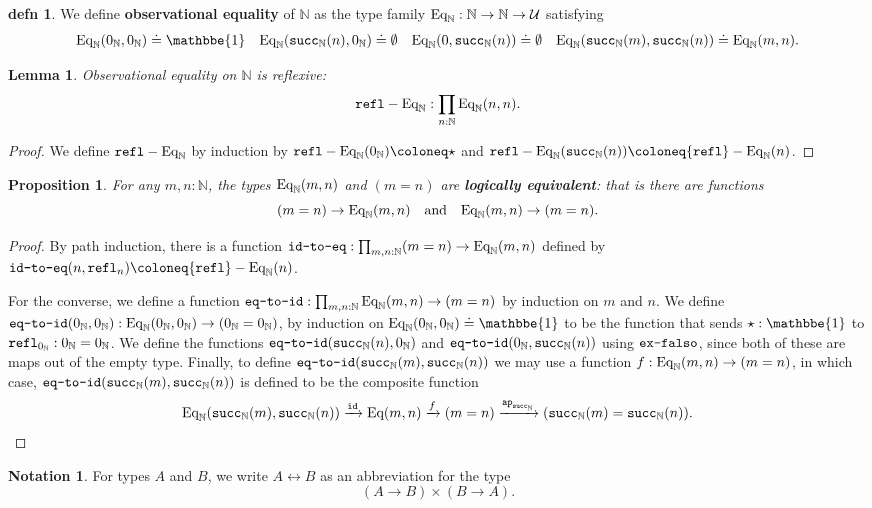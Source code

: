 \documentclass{amsart}
\theoremstyle{theorem}
\newtheorem*{lem}{Lemma}
\newtheorem*{prop}{Proposition}
\theoremstyle{definition}
\newtheorem*{defn}{defn}
\newtheorem*{ntn}{Notation}
\theoremstyle{remark}
\newcommand{\0}{\mathbbe{0}}
\newcommand{\1}{\mathbbe{1}}
\newcommand{\2}{\mathbbe{2}}
\newcommand{\3}{\mathbbe{3}}
\newcommand{\4}{\mathbbe{4}}
\newcommand{\term}[1]{{\textup{\texttt{#1}}}}
\newcommand{\id}{\term{id}}
\newcommand{\bN}{{\mathbb{N}}}
\newcommand{\suc}{\term{succ}_{\bN}}
\newcommand{\refl}{\term{refl}}
\newcommand{\ap}{\term{ap}}
\newcommand{\UU}{\mathcal{U}}
\newcommand{\Eq}{\textup{\text{Eq}}}
\begin{document}
\begin{defn} We define \textbf{observational equality} of $\bN$ as the type family $\Eq_\bN : \bN \to \bN \to \UU$ satisfying
\[ \Eq_\bN(0_\bN,0_\bN) \doteq \1 \quad \Eq_\bN(\suc(n),0_\bN) \doteq \emptyset \quad \Eq_\bN(0,\suc(n)) \doteq \emptyset \quad \Eq_\bN(\suc(m), \suc(n)) \doteq \Eq_\bN(m,n).\]
\end{defn}

\begin{lem} Observational equality on $\bN$ is reflexive:
\[ \refl-\Eq_\bN : \prod_{n : \bN} \Eq_\bN(n,n).\]
\end{lem}
\begin{proof}
We define $\refl-\Eq_\bN$ by induction by $\refl-\Eq_\bN(0_\bN) \coloneq \star$ and $\refl-\Eq_\bN(\suc(n)) \coloneq \refl-\Eq_\bN(n)$.
\end{proof}

\begin{prop} For any $m,n : \bN$, the types $\Eq_\bN(m,n)$ and $(m=n)$ are \textbf{logically equivalent}: that is there are functions
\[ (m = n) \to \Eq_\bN(m,n) \quad \text{and} \quad \Eq_\bN(m,n) \to (m=n).\]
\end{prop}
\begin{proof}
By path induction, there is a function $\term{id-to-eq} : \prod_{m,n: \bN} (m =n) \to \Eq_\bN(m,n)$ defined by $\term{id-to-eq}(n,\refl_n) \coloneq \refl-\Eq_\bN(n)$. 

For the converse, we define a function $\term{eq-to-id} : \prod_{m,n : \bN} \Eq_\bN(m,n) \to (m=n)$ by induction on $m$ and $n$. We define $\term{eq-to-id}(0_\bN,0_\bN) : \Eq_\bN(0_\bN,0_\bN) \to (0_\bN = 0_\bN)$, by induction on $\Eq_\bN(0_\bN,0_\bN) \doteq \1$ to be the function that sends $\star : \1$ to $\refl_{0_\bN} : 0_\bN = 0_\bN$. We define the functions $\term{eq-to-id}(\suc(n),0_\bN)$ and $\term{eq-to-id}(0_\bN,\suc(n))$ using $\term{ex-falso}$, since both of these are maps out of the empty type. Finally, to define $\term{eq-to-id}(\suc(m),\suc(n))$ we may use a function $f : \Eq_\bN(m,n) \to (m=n)$, in which case, $\term{eq-to-id}(\suc(m),\suc(n))$  is defined to be the composite function
\[ \Eq_\bN(\suc(m),\suc(n)) \xrightarrow{\id} \Eq(m,n) \xrightarrow{f} (m=n) \xrightarrow{\ap_{\suc}} (\suc(m)=\suc(n)).\]
\end{proof}

\begin{ntn} For types $A$ and $B$, we write $A \leftrightarrow B$ as an abbreviation for the type
\[ (A \to B) \times (B \to A).\]
\end{ntn}
\end{document}
